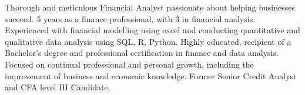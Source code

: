 

\begin{cvparagraph}

Thorough and meticulous Financial Analyst passionate about helping businesses succeed.
5 years as a finance professional, with 3 in financial analysis.
Experienced with financial modelling using excel and conducting quantitative and qualitative data analysis using SQL, R, Python.
Highly educated, recipient of a Bachelor's degree and professional certification in finance and data analysis. 
Focused on continual professional and personal growth, including the improvement of business and economic knowledge.
Former Senior Credit Analyst and CFA level III Candidate.
\end{cvparagraph}
